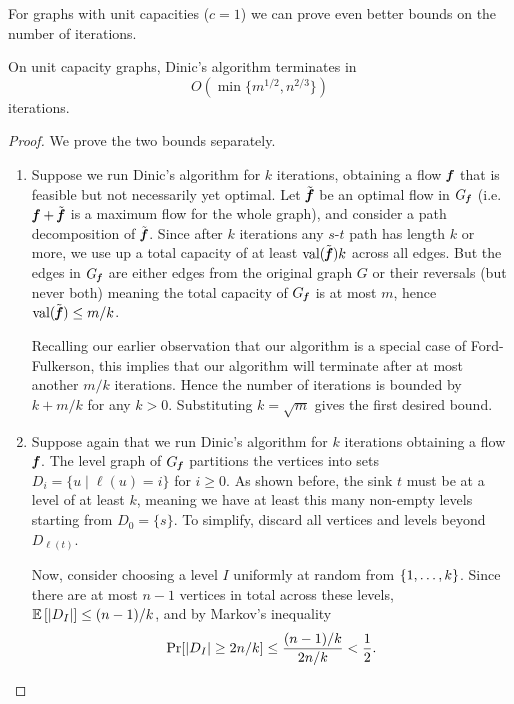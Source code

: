 For graphs with unit capacities ($c = 1$) we can prove even better bounds on the number of iterations.
\begin{theorem}
  On unit capacity graphs, Dinic's algorithm terminates in
  $$O\left(\min\{m^{1/2}, n^{2/3}\}\right)$$ iterations.
\end{theorem}
\begin{proof}
  We prove the two bounds separately.
  \begin{enumerate}
  \item Suppose we run Dinic's algorithm for $k$ iterations, obtaining a flow $\boldsymbol{\mathit{f}}$ that is
    feasible but not necessarily yet optimal. Let $\tilde{\boldsymbol{\mathit{f}}}$ be an optimal flow in
    $G_{\boldsymbol{\mathit{f}}}$ (i.e. $\boldsymbol{\mathit{f}}+\tilde{\boldsymbol{\mathit{f}}}$ is a maximum flow for the whole graph),
    and consider a path decomposition of $\tilde{\boldsymbol{\mathit{f}}}$. Since after $k$ iterations
    any $s$-$t$ path has length $k$ or more, we use up a total capacity of at least
    $\text{val}(\tilde{\boldsymbol{\mathit{f}}})k$ across all edges. But the edges in $G_{\boldsymbol{\mathit{f}}}$ are either edges
    from the original graph $G$ or their reversals (but never both) meaning the total
    capacity of $G_{\boldsymbol{\mathit{f}}}$ is at most $m$, hence $\text{val}(\tilde{\boldsymbol{\mathit{f}}}) \leq m/k$.

    Recalling our earlier observation that our algorithm is a special case of
    Ford-Fulkerson, this implies that our algorithm will terminate after at most
    another $m/k$ iterations. Hence the number of iterations is bounded by $k+m/k$ for
    any $k>0$. Substituting $k=\sqrt{m}$ gives the first desired bound.
  \item Suppose again that we run Dinic's algorithm for $k$ iterations obtaining a flow $\boldsymbol{\mathit{f}}$.
    The level graph of $G_{\boldsymbol{\mathit{f}}}$ partitions the vertices into sets
    $D_i = \{u\mid\ell(u) = i\}$ for $i\geq 0$.
    As shown before, the sink $t$ must be at a level of at
    least $k$, meaning we have at least this many non-empty levels starting from
    $D_0 = \{s\}$. To simplify, discard all vertices and levels beyond $D_{\ell(t)}$.

    Now, consider choosing a level $I$ uniformly at random from
    $\left\{1,\ldots,k \right\}$.
    Since there are at most $n-1$ vertices in total across these levels,
    $\mathop{{}\mathbb{E}}\left[\left|D_I \right|\right] \leq (n-1)/k$, and by Markov's inequality
    \[
      \Pr[ \left|D_I \right| \geq 2n/k ] \leq
      \frac{(n-1)/k}{2n/k} < \frac{1}{2}
      .
    \]


\end{enumerate}
\end{proof}
